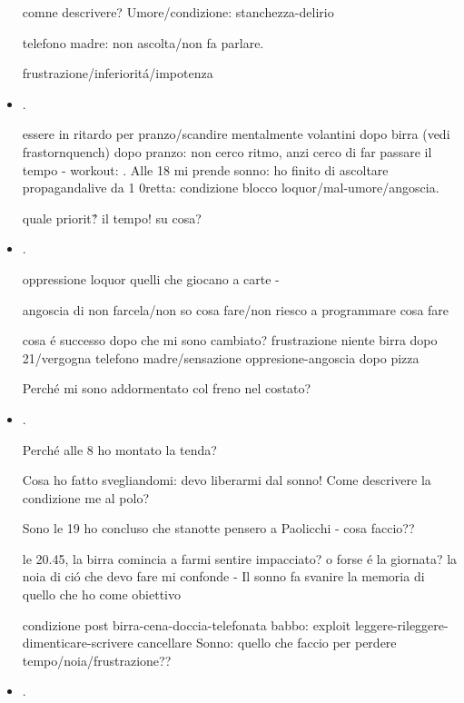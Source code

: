 \begin{itemize}
 comne descrivere? Umore/condizione: stanchezza-delirio

telefono madre: non ascolta/non fa parlare.

 frustrazione/inferiorit\'a/impotenza

\item {}.

essere in ritardo per pranzo/scandire mentalmente volantini dopo birra (vedi frastornquench)
dopo pranzo: non cerco ritmo, anzi cerco di far passare il tempo - workout: . Alle 18 mi prende sonno: ho finito di ascoltare propagandalive da 1 0retta: condizione blocco loquor/mal-umore/angoscia.

quale priorit\'? il tempo! su cosa?

\item {}.

oppressione loquor quelli che giocano a carte - 

angoscia di non farcela/non so cosa fare/non riesco a programmare cosa fare

cosa \'e successo dopo che mi sono cambiato? frustrazione niente birra dopo 21/vergogna telefono madre/sensazione oppresione-angoscia dopo pizza

Perch\'e mi sono addormentato col freno nel costato?

\item {}.

Perch\'e alle 8 ho montato la tenda?

Cosa ho fatto svegliandomi: devo liberarmi dal sonno!
Come descrivere la condizione me al polo?

Sono le 19 ho concluso che stanotte pensero a Paolicchi - cosa faccio??

le 20.45, la birra comincia a farmi sentire impacciato? o forse \'e la giornata? la noia di ci\'o che devo fare mi confonde - Il sonno fa svanire la memoria di quello che ho come obiettivo

condizione post birra-cena-doccia-telefonata babbo: exploit leggere-rileggere-dimenticare-scrivere cancellare
Sonno: quello che faccio per perdere tempo/noia/frustrazione??

\item {}.


\end{itemize}
